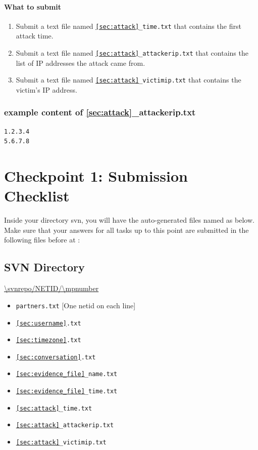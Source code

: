 \documentclass[letterpaper,12pt]{report}
\begin{document}
\paragraph{What to submit}
\begin{enumerate}
\item Submit a text file named \texttt{\ref{sec:attack}\_time.txt} that contains the first attack time.
\item Submit a text file named \texttt{\ref{sec:attack}\_attackerip.txt} that contains the list of IP addresses the attack came from.
\item Submit a text file named \texttt{\ref{sec:attack}\_victimip.txt} that contains the victim's IP address.
\end{enumerate}

\subsubsection*{example content of {\ref{sec:attack}\_attackerip.txt}}
\begin{mdframed}
\begin{Verbatim}
1.2.3.4
5.6.7.8
\end{Verbatim}
\end{mdframed}

\newpage

\section*{Checkpoint 1: Submission Checklist}

Inside your \texttt{\mpnumber} directory svn, you will have the auto-generated files named as below.  Make sure that your answers for all tasks up to this point are submitted in the following files before \textbf{\checkpointduedate} at \textbf{\duetime}:

\subsection*{SVN Directory}
\url{\svnrepo/NETID/\mpnumber}

\begin{itemize}
\item {\tt partners.txt} [One netid on each line]
\item \texttt{\ref{sec:username}.txt}
\item \texttt{\ref{sec:timezone}.txt}
\item \texttt{\ref{sec:conversation}.txt}
\item \texttt{\ref{sec:evidence_file}\_name.txt}
\item \texttt{\ref{sec:evidence_file}\_time.txt}
\item \texttt{\ref{sec:attack}\_time.txt}
\item \texttt{\ref{sec:attack}\_attackerip.txt}
\item \texttt{\ref{sec:attack}\_victimip.txt}
\end{itemize}
\end{document}
